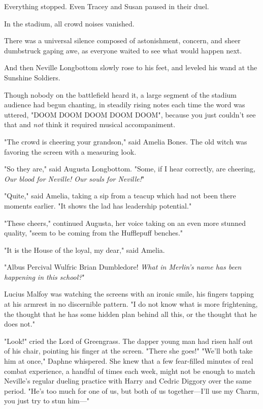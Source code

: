 Everything stopped. Even Tracey and Susan paused in their duel.

In the stadium, all crowd noises vanished.

There was a universal silence composed of astonishment, concern, and sheer 
dumbstruck gaping awe, as everyone waited to see what would happen next.

And then Neville Longbottom slowly rose to his feet, and leveled his wand at 
the Sunshine Soldiers.

Though nobody on the battlefield heard it, a large segment of the stadium 
audience had begun chanting, in steadily rising notes each time the word was 
uttered, "DOOM DOOM DOOM DOOM DOOM", because you just couldn't see that and 
\emph{not} think it required musical accompaniment.

"The crowd is cheering your grandson," said Amelia Bones. The old witch was 
favoring the screen with a measuring look.

"So they are," said Augusta Longbottom. "Some, if I hear correctly, are 
cheering, \emph{Our blood for Neville! Our souls for Neville!}"

"Quite," said Amelia, taking a sip from a teacup which had not been there 
moments earlier. "It shows the lad has leadership potential."

"These cheers," continued Augusta, her voice taking on an even more stunned 
quality, "seem to be coming from the Hufflepuff benches."

"It is the House of the loyal, my dear," said Amelia.

"Albus Percival Wulfric Brian Dumbledore!\emph{ What in Merlin's name has been 
happening in this school?}"

Lucius Malfoy was watching the screens with an ironic smile, his fingers 
tapping at his armrest in no discernible pattern. "I do not know what is more 
frightening, the thought that he has some hidden plan behind all this, or the 
thought that he does not."

"Look!" cried the Lord of Greengrass. The dapper young man had risen half out 
of his chair, pointing his finger at the screen. "There she goes!"
\sbreak
"We'll both take him at once," Daphne whispered. She knew that a few 
fear-filled minutes of real combat experience, a handful of times each week, 
might not be enough to match Neville's regular dueling practice with Harry and 
Cedric Diggory over the same period. "He's too much for one of us, but both of 
us together---I'll use my Charm, you just try to stun him---"


